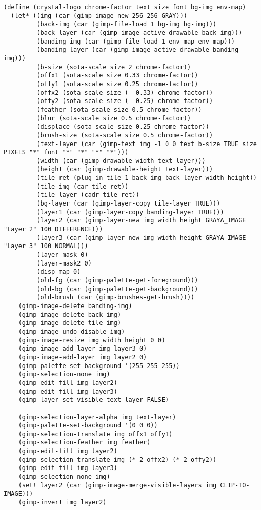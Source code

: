 \documentclass{article}
\begin{document}
{\begin{verbatim}
(define (crystal-logo chrome-factor text size font bg-img env-map)
  (let* ((img (car (gimp-image-new 256 256 GRAY)))
         (back-img (car (gimp-file-load 1 bg-img bg-img)))
         (back-layer (car (gimp-image-active-drawable back-img)))
         (banding-img (car (gimp-file-load 1 env-map env-map)))
         (banding-layer (car (gimp-image-active-drawable banding-img)))
         (b-size (sota-scale size 2 chrome-factor))
         (offx1 (sota-scale size 0.33 chrome-factor))
         (offy1 (sota-scale size 0.25 chrome-factor))
         (offx2 (sota-scale size (- 0.33) chrome-factor))
         (offy2 (sota-scale size (- 0.25) chrome-factor))
         (feather (sota-scale size 0.5 chrome-factor))
         (blur (sota-scale size 0.5 chrome-factor))
         (displace (sota-scale size 0.25 chrome-factor))
         (brush-size (sota-scale size 0.5 chrome-factor))
         (text-layer (car (gimp-text img -1 0 0 text b-size TRUE size PIXELS "*" font "*" "*" "*" "*")))
         (width (car (gimp-drawable-width text-layer)))
         (height (car (gimp-drawable-height text-layer)))
         (tile-ret (plug-in-tile 1 back-img back-layer width height))
         (tile-img (car tile-ret))
         (tile-layer (cadr tile-ret))
         (bg-layer (car (gimp-layer-copy tile-layer TRUE)))
         (layer1 (car (gimp-layer-copy banding-layer TRUE)))
         (layer2 (car (gimp-layer-new img width height GRAYA_IMAGE "Layer 2" 100 DIFFERENCE)))
         (layer3 (car (gimp-layer-new img width height GRAYA_IMAGE "Layer 3" 100 NORMAL)))
         (layer-mask 0)
         (layer-mask2 0)
         (disp-map 0)
         (old-fg (car (gimp-palette-get-foreground)))
         (old-bg (car (gimp-palette-get-background)))
         (old-brush (car (gimp-brushes-get-brush))))
    (gimp-image-delete banding-img)
    (gimp-image-delete back-img)
    (gimp-image-delete tile-img)
    (gimp-image-undo-disable img)
    (gimp-image-resize img width height 0 0)
    (gimp-image-add-layer img layer3 0)
    (gimp-image-add-layer img layer2 0)
    (gimp-palette-set-background '(255 255 255))
    (gimp-selection-none img)
    (gimp-edit-fill img layer2)
    (gimp-edit-fill img layer3)
    (gimp-layer-set-visible text-layer FALSE)

    (gimp-selection-layer-alpha img text-layer)
    (gimp-palette-set-background '(0 0 0))
    (gimp-selection-translate img offx1 offy1)
    (gimp-selection-feather img feather)
    (gimp-edit-fill img layer2)
    (gimp-selection-translate img (* 2 offx2) (* 2 offy2))
    (gimp-edit-fill img layer3)
    (gimp-selection-none img)
    (set! layer2 (car (gimp-image-merge-visible-layers img CLIP-TO-IMAGE)))
    (gimp-invert img layer2)


\end{verbatim}}
\end{document}
